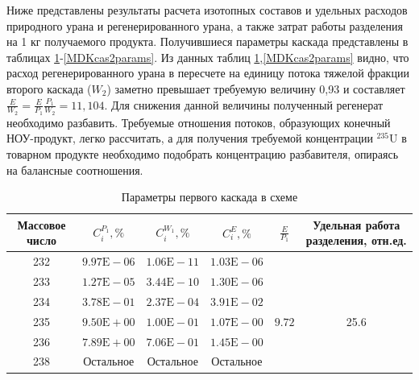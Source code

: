 Ниже представлены результаты расчета изотопных составов и удельных расходов природного урана и регенерированного урана, а также затрат работы разделения на 1 кг получаемого продукта. Получившиеся параметры каскада представлены в таблицах \ref{MDKcas1params}-\ref{MDKcas2params}. Из данных таблиц \ref{MDKcas1params},\ref{MDKcas2params} видно, что расход регенерированного урана в пересчете на единицу потока тяжелой фракции второго каскада ($W_{2}$) заметно превышает требуемую величину 0,93 и составляет $\frac{E}{W_{2}}=\frac{E}{P_{1}} \frac{P_{1}}{W_{2}}=11,104$. Для снижения данной величины полученный регенерат необходимо разбавить. Требуемые отношения потоков, образующих конечный НОУ-продукт, легко рассчитать, а для получения требуемой концентрации $^{235}$U в товарном продукте необходимо подобрать концентрацию разбавителя, опираясь на балансные соотношения.


\begin{table}
\begin{tabular}{|c|c|c|c|c|c|}
    \hline Массовое число & $C_{i}^{P_{1}}, \%$ & $C_{i}^{W_{1}}, \%$ & $C_{i}^{E}, \%$ & $\frac{E}{P_{1}}$ & Удельная работа разделения, отн.ед. \\
    \hline 232 & $9.97 \mathrm{E}-06$ & $1.06 \mathrm{E}-11$ & $1.03 \mathrm{E}-06$ & & \\
    233 & $1.27 \mathrm{E}-05$ & $3.44 \mathrm{E}-10$ & $1.30 \mathrm{E}-06$ & & \\
    234 & $3.78 \mathrm{E}-01$ & $2.37 \mathrm{E}-04$ & $3.91 \mathrm{E}-02$ & & \\
    235 & $9.50 \mathrm{E}+00$ & $1.00 \mathrm{E}-01$ & $1.07 \mathrm{E}-00$ & $9.72$ & 25.6 \\
    236 & $7.89 \mathrm{E}+00$ & $7.06 \mathrm{E}-01$ & $1.45 \mathrm{E}-00$ & & \\
    238 & Остальное & Остальное & Остальное & & \\
    \hline
\end{tabular}
\caption{Параметры первого каскада в схеме}\label{MDKcas1params}
\end{table}

